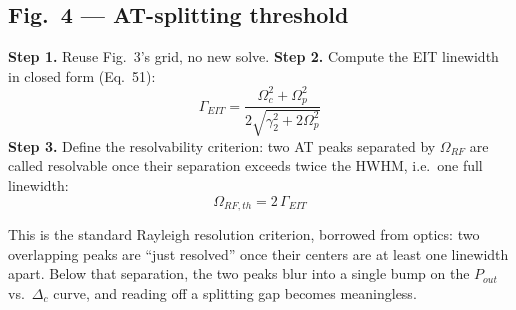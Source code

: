 \documentclass[11pt]{article}
\begin{document}
\subsection*{Fig.~4 --- AT-splitting threshold}
\textbf{Step 1.} Reuse Fig.~3's grid, no new solve.
\textbf{Step 2.} Compute the EIT linewidth in closed form (Eq.~51):
\[
\Gamma_{EIT}=\frac{\Omega_c^2+\Omega_p^2}{2\sqrt{\gamma_2^2+2\Omega_p^2}}
\]
\textbf{Step 3.} Define the resolvability criterion: two AT peaks separated by $\Omega_{RF}$ are called resolvable once their separation exceeds twice the HWHM, i.e.\ one full linewidth:
\[
\boxed{\Omega_{RF,th} = 2\,\Gamma_{EIT}}
\]
\begin{eqmeaning}
This is the standard Rayleigh resolution criterion, borrowed from optics: two overlapping peaks are ``just resolved'' once their centers are at least one linewidth apart. Below that separation, the two peaks blur into a single bump on the $P_{out}$ vs.\ $\Delta_c$ curve, and reading off a splitting gap becomes meaningless.
\end{eqmeaning}
\begin{center}
\end{center}
\end{document}
